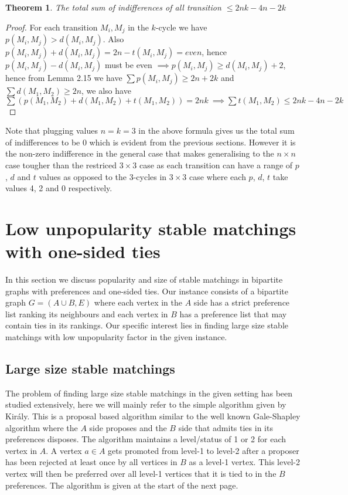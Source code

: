 \documentclass[a4paper,10pt]{article}
\theoremstyle{plain} %
\newtheorem{theorem}{Theorem}[section] %
\theoremstyle{plain} %
\begin{document}
\begin{theorem}
    The total sum of indifferences of all transition $\leq 2nk - 4n - 2k$
\end{theorem}

\begin{proof}
    For each transition $M_i, M_j$ in the $k$-cycle we have $p(M_i, M_j) > d(M_i, M_j)$. Also $p(M_i, M_j) + d(M_i, M_j) = 2n - t(M_i, M_j) = even$, hence $p(M_i, M_j) - d(M_i, M_j)$ must be even $\implies p(M_i, M_j) \geq d(M_i, M_j) + 2$, hence from Lemma 2.15 we have $\sum p(M_i, M_j) \geq 2n + 2k$ and $\sum d(M_1, M_2) \geq 2n$, we also have $\sum (p(M_1, M_2) + d(M_1, M_2) + t(M_1, M_2)) = 2nk \ \implies \sum t(M_1, M_2) \leq 2nk - 4n - 2k$
\end{proof}

Note that plugging values $n = k = 3$ in the above formula gives us the total sum of indifferences to be $0$ which is evident from the previous sections. However it is the non-zero indifference in the general case that makes generalising to the $n \times n$ case tougher than the restriced $3 \times 3$ case as each transition can have a range of $p$, $d$ and $t$ values as opposed to the 3-cycles in $3 \times 3$ case where each $p$, $d$, $t$ take values 4, 2 and 0 respectively.

\section{Low unpopularity stable matchings with one-sided ties}
In this section we discuss popularity and size of stable matchings in bipartite graphs with preferences and one-sided ties. Our instance consists of a bipartite graph $G = (A \cup B, E)$ where each vertex in the $A$ side has a strict preference list ranking its neighbours and each vertex in $B$ has a preference list that may contain ties in its rankings. Our specific interest lies in finding large size stable matchings with low unpopularity factor in the given instance.

\subsection{Large size stable matchings}
The problem of finding large size stable matchings in the given setting has been studied extensively, here we will mainly refer to the simple algorithm given by Király\cite{kiraly2011better}. This is a proposal based algorithm similar to the well known Gale-Shapley algorithm where the $A$ side proposes and the $B$ side that admits ties in its preferences disposes. The algorithm maintains a level/status of 1 or 2 for each vertex in $A$. A vertex $a \in A$ gets promoted from level-1 to level-2 after a proposer has been rejected at least once by all vertices in $B$ as a level-1 vertex. This level-2 vertex will then be preferred over all level-1 vertices that it is tied to in the $B$ preferences. The algorithm is given at the start of the next page.
\end{document}

